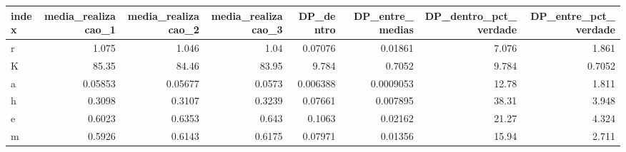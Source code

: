 \begin{tabular}{lrrrrrrr}
\toprule
index & media\_realizacao\_1 & media\_realizacao\_2 & media\_realizacao\_3 & DP\_dentro & DP\_entre\_medias & DP\_dentro\_pct\_verdade & DP\_entre\_pct\_verdade \\
\midrule
r & 1.075 & 1.046 & 1.04 & 0.07076 & 0.01861 & 7.076 & 1.861 \\
K & 85.35 & 84.46 & 83.95 & 9.784 & 0.7052 & 9.784 & 0.7052 \\
a & 0.05853 & 0.05677 & 0.0573 & 0.006388 & 0.0009053 & 12.78 & 1.811 \\
h & 0.3098 & 0.3107 & 0.3239 & 0.07661 & 0.007895 & 38.31 & 3.948 \\
e & 0.6023 & 0.6353 & 0.643 & 0.1063 & 0.02162 & 21.27 & 4.324 \\
m & 0.5926 & 0.6143 & 0.6175 & 0.07971 & 0.01356 & 15.94 & 2.711 \\
\bottomrule
\end{tabular}

